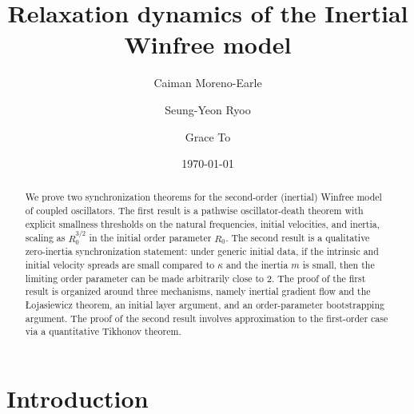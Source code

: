 \documentclass[11pt,reqno]{amsart}
\title{Relaxation dynamics of the Inertial Winfree model}
\author[Moreno-Earle]{Caiman Moreno-Earle}
\author[Ryoo]{Seung-Yeon Ryoo }
\author[To]{Grace To}
\date{\today}
\newcounter{name}
\theoremstyle{definition}
\theoremstyle{remark}
\begin{document}
 


\begin{abstract}
We prove two synchronization theorems for the second-order (inertial) Winfree model of coupled oscillators. The first result is a pathwise oscillator-death theorem with explicit smallness thresholds on the natural frequencies, initial velocities, and inertia, scaling as $R_0^{3/2}$ in the initial order parameter $R_0$. The second result is a qualitative zero-inertia synchronization statement: under generic initial data, if the intrinsic and initial velocity spreads are small compared to $\kappa$ and the inertia $m$ is small, then the limiting order parameter can be made arbitrarily close to 2. The proof of the first result is organized around three mechanisms, namely inertial gradient flow and the {\L}ojasiewicz theorem, an initial layer argument, and an order-parameter bootstrapping argument. The proof of the second result involves approximation to the first-order case via a quantitative Tikhonov theorem.
\end{abstract}
\maketitle

\tableofcontents

\section{Introduction}\label{sec:intro}
\end{document}

